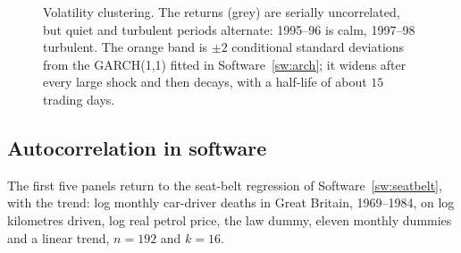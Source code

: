 \documentclass[11pt,a4paper]{article}
\numberwithin{equation}{section}
\theoremstyle{definition}
\begin{document}
\begin{figure}[H]
\caption{Volatility clustering. The returns (grey) are serially uncorrelated, but quiet and turbulent periods alternate: 1995--96 is calm, 1997--98
turbulent. The orange band is $\pm2$ conditional standard deviations from the GARCH(1,1) fitted in Software~\ref{sw:arch}; it widens after every large shock and
then decays, with a half-life of about $15$ trading days.}
\label{fig:dax}
\end{figure}

\subsection{Autocorrelation in software}
\label{ssec:software11}

The first five panels return to the seat-belt regression of Software~\ref{sw:seatbelt}, with the trend: log monthly car-driver deaths in Great Britain,
1969--1984, on log kilometres driven, log real petrol price, the law dummy, eleven monthly dummies and a linear trend, $n = 192$ and $k = 16$.
\end{document}
